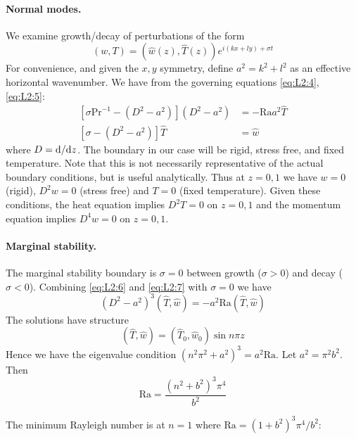 \documentclass{jknotes}
\begin{document}
\paragraph{Normal modes.} We examine growth/decay of perturbations of the form
\begin{equation}
	(w,T) = (\hat{w}(z),\hat{T}(z))e^{i(kx+ly)+\sigma t}
\end{equation}
For convenience, and given the $x, y$ symmetry, define $a^2 = k^2 + l^2$ as an
effective horizontal wavenumber. We have from the governing equations
\eqref{eq:L2:4}, \eqref{eq:L2:5}:
\begin{align}
	\left[\sigma \text{Pr}^{-1} - (D^2 - a^2)\right](D^2-a^2) &= -\text{Ra}
	a^2 \hat{T} \label{eq:L2:6}\\
	\left[ \sigma - (D^2 - a^2) \right] \hat{T} &= \hat{w} \label{eq:L2:7}
\end{align}
where $D = \diffd/\diffd z$. The boundary in our case will be
rigid, stress free, and fixed temperature. Note that this is not necessarily
representative of the actual boundary conditions, but is useful analytically.
Thus at $z= 0, 1$ we have $w = 0$ (rigid), $D^2 w = 0$ (stress free) and $T=
0 $ (fixed temperature). Given these conditions, the heat equation implies
$D^2 T = 0$ on $z=0,1$ and the momentum equation implies $D^4 w = 0$ on
$z=0,1$. 

\paragraph{Marginal stability.} The marginal stability boundary is $\sigma =
0$ between growth ($\sigma > 0$) and decay ($\sigma < 0$). Combining
\eqref{eq:L2:6} and \eqref{eq:L2:7} with $\sigma = 0$ we have
\begin{equation}
 (D^2 - a^2)^3 (\hat{T},\hat{w}) = -a^2 \text{Ra}(\hat{T},\hat{w})
\end{equation}
The solutions have structure 
\begin{equation}
 (\hat{T}, \hat{w}) =  (\hat{T}_0, \hat{w}_0) \sin n \pi z
\end{equation}
Hence we have the eigenvalue condition $(n^2 \pi^2 + a^2)^3 = a^2 \text{Ra}$.
Let $a^2 = \pi^2 b^2$. Then
\begin{equation}
 \text{Ra} = \frac{(n^2 + b^2)^3 \pi^4}{b^2}
\end{equation}

The minimum Rayleigh number is at $n=1$ where $\text{Ra} = (1+b^2)^3
\pi^4/b^2$:
\begin{center}
\end{center}
\end{document}
